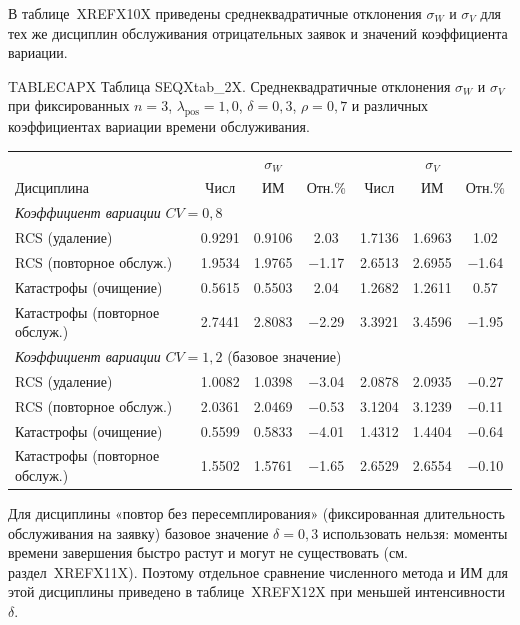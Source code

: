 В таблице~XREFX10X приведены среднеквадратичные отклонения \(\sigma_W\) и \(\sigma_V\) для тех же дисциплин обслуживания отрицательных заявок и значений коэффициента вариации.

\noindent TABLECAPX Таблица SEQXtab_2X. Среднеквадратичные отклонения $\sigma_W$ и $\sigma_V$ при фиксированных $n=3$, $\lambda_{\text{pos}}=1{,}0$, $\delta=0{,}3$, $\rho=0{,}7$ и различных коэффициентах вариации времени обслуживания.\par



\begin{tabular}{lcccccc}
\toprule
 & \multicolumn{3}{c}{$\sigma_W$} & \multicolumn{3}{c}{$\sigma_V$} \\
 
Дисциплина & Числ & ИМ & Отн.\% & Числ & ИМ & Отн.\% \\
\midrule
\multicolumn{7}{l}{\textit{Коэффициент вариации} $CV=0{,}8$} \\
RCS (удаление) & 0.9291 & 0.9106 & 2.03 & 1.7136 & 1.6963 & 1.02 \\
RCS (повторное обслуж.) & 1.9534 & 1.9765 & $-$1.17 & 2.6513 & 2.6955 & $-$1.64 \\
Катастрофы (очищение) & 0.5615 & 0.5503 & 2.04 & 1.2682 & 1.2611 & 0.57 \\
Катастрофы (повторное обслуж.) & 2.7441 & 2.8083 & $-$2.29 & 3.3921 & 3.4596 & $-$1.95 \\
\midrule
\multicolumn{7}{l}{\textit{Коэффициент вариации} $CV=1{,}2$ (базовое значение)} \\
RCS (удаление) & 1.0082 & 1.0398 & $-$3.04 & 2.0878 & 2.0935 & $-$0.27 \\
RCS (повторное обслуж.) & 2.0361 & 2.0469 & $-$0.53 & 3.1204 & 3.1239 & $-$0.11 \\
Катастрофы (очищение) & 0.5599 & 0.5833 & $-$4.01 & 1.4312 & 1.4404 & $-$0.64 \\
Катастрофы (повторное обслуж.) & 1.5502 & 1.5761 & $-$1.65 & 2.6529 & 2.6554 & $-$0.10 \\
\bottomrule
\end{tabular}




Для дисциплины «повтор без пересемплирования» (фиксированная длительность обслуживания на заявку) базовое значение \(\delta=0{,}3\) использовать нельзя: моменты времени завершения быстро растут и могут не существовать (см. раздел~XREFX11X). Поэтому отдельное сравнение численного метода и ИМ для этой дисциплины приведено в таблице~XREFX12X при меньшей интенсивности \(\delta\).





